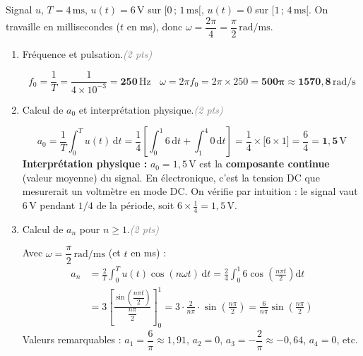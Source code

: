 \documentclass[a4paper,11pt]{article}
\newcommand{\dt}{\mathrm{d}t}
\newcommand{\reponse}[1]{%
  \begin{tcolorbox}[corrbox={}]
    #1
  \end{tcolorbox}%
}
\newcommand{\pts}[1]{\hfill\textcolor{gray}{\small\textit{(#1 pts)}}}
\begin{document}
\begin{tcolorbox}[exobox={Exercice 2 \hfill \normalfont\textit{(10 points)}}]
  Signal $u$, $T = 4\,\mathrm{ms}$, $u(t)=6\,\mathrm{V}$ sur $[0\,;\,1\,\mathrm{ms}[$,
  $u(t)=0$ sur $[1\,;\,4\,\mathrm{ms}[$.
  On travaille en millisecondes ($t$ en ms), donc $\omega = \dfrac{2\pi}{4} = \dfrac{\pi}{2}\,\mathrm{rad/ms}$.
\end{tcolorbox}

\begin{enumerate}[label=\textbf{\arabic*.}, leftmargin=*, itemsep=0.4cm]

  \item Fréquence et pulsation.\pts{2}

  \reponse{
    \[
      f_0 = \frac{1}{T} = \frac{1}{4\times10^{-3}} = \mathbf{250\,\mathrm{Hz}} ~~~~
      \omega = 2\pi f_0 = 2\pi \times 250 = \mathbf{500\pi \approx 1570{,}8\,\mathrm{rad/s}}
    \]
  }

  \item Calcul de $a_0$ et interprétation physique.\pts{2}

  \reponse{
    \[
      a_0 = \frac{1}{T}\int_0^{T} u(t)\,\dt
           = \frac{1}{4}\left[\int_0^{1} 6\,\dt + \int_1^{4} 0\,\dt\right]
           = \frac{1}{4}\times\bigl[6\times 1\bigr]
           = \frac{6}{4} = \mathbf{1{,}5\,\mathrm{V}}
    \]
    \textbf{Interprétation physique :} $a_0 = 1{,}5\,\mathrm{V}$ est la \textbf{composante continue}
    (valeur moyenne) du signal. En électronique, c'est la tension DC que mesurerait un voltmètre en mode DC.
    On vérifie par intuition : le signal vaut $6\,\mathrm{V}$ pendant $1/4$ de la période,
    soit $6 \times \frac{1}{4} = 1{,}5\,\mathrm{V}$.
  }

  \item Calcul de $a_n$ pour $n \geq 1$.\pts{2}

  \reponse{
    Avec $\omega = \dfrac{\pi}{2}\,\mathrm{rad/ms}$ (et $t$ en ms) :
    \begin{align*}
      a_n &= \frac{2}{T}\int_0^{T} u(t)\cos(n\omega t)\,\dt
           = \frac{2}{4}\int_0^{1} 6\cos\!\left(\frac{n\pi t}{2}\right)\dt \\[4pt]
          &= 3\left[\frac{\sin\!\left(\dfrac{n\pi t}{2}\right)}{\dfrac{n\pi}{2}}\right]_0^{1}
           = 3 \cdot \frac{2}{n\pi}\cdot\sin\!\left(\frac{n\pi}{2}\right) 
          =\boxed{\frac{6}{n\pi}\sin\!\left(\frac{n\pi}{2}\right)}
    \end{align*}
    Valeurs remarquables :
    $a_1 = \dfrac{6}{\pi}\approx 1{,}91$,\quad
    $a_2 = 0$,\quad
    $a_3 = -\dfrac{2}{\pi}\approx -0{,}64$,\quad
    $a_4 = 0$, etc.
  }


\end{enumerate}
\end{document}
